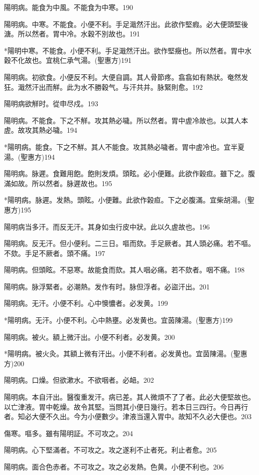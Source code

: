\documentclass[12pt,twoside,UTF8,b5paper]{ctexbook}
\begin{document}
陽明病。能食为中風。不能食为中寒。190

陽明{病。}中寒。不能食。小便不利。手足濈然汗出。此欲作堅瘕。必大便頭堅後溏。所以然者。胃中冷。水穀不別故也。191

*陽明中寒。不能食。小便不利。手足濈然汗出。欲作堅癥也。所以然者。胃中水穀不化故也。宜桃仁承气湯。(聖惠方)191

陽明病。初欲食。小便反不利。大便自調。其人骨節疼。翕翕如有熱狀。奄然发狂。濈然汗出而觧。此为水不勝穀气。与汗共并。脉緊則愈。192

陽明病欲觧时。從申尽戍。193

陽明病。不能食。下之不觧。攻其熱必噦。所以然者。胃中虗冷故也。{以其人本虗。故攻其熱必噦。}194

*陽明病。能食。下之不觧。其人不能食。攻其熱必噦者。胃中虗冷也。宜半夏湯。(聖惠方)194

陽明病。脉遲。食難用飽。飽則发煩。頭眩。必小便難。此欲作穀疸。雖下之。腹滿如故。所以然者。脉遲故也。195

*陽明病。脉遲。发熱。頭眩。小便難。此欲作榖疸。下之必腹滿。宜柴胡湯。(聖惠方)195

陽明病当多汗。而反无汗。其身如虫行皮中狀。此以久虗故也。196

陽明病。反无汗。但小便利。二三日。嘔而欬。手足厥者。其人頭必痛。若不嘔。不欬。手足不厥者。頭不痛。197

陽明病。但頭眩。不惡寒。故能食而欬。其人咽必痛。若不欬者。咽不痛。198

陽明病。脉浮緊者。必潮熱。发作有时。{脉}但浮者。必盜汗出。201

陽明病。无汗。小便不利。心中懊憹者。必发黄。199

*陽明病。无汗。小便不利。心中熱壅。必发黄也。宜茵陳湯。(聖惠方)199

陽明病。被火。額上微汗出。小便不利者。必发黄。200

*陽明病。被火灸。其額上微有汗出。小便不利者。必发黄也。宜茵陳湯。(聖惠方)200

陽明病。口燥。但欲漱水。不欲咽者。必衄。202

陽明病。本自汗出。醫復重发汗。病已差。其人微煩不了了者。此必大便堅故也。以亡津液。胃中乾燥。故令其堅。当問其小便日幾行。若本日三四行。今日再行者。知必大便不久出。今为小便數少。津液当還入胃中。故知不久必大便也。203

傷寒。嘔多。雖有陽明証。不可攻之。204

陽明病。心下堅滿者。不可攻之。攻之遂利不止者死。利止者愈。205

陽明病。面合色赤者。不可攻之。{攻之}必发熱。色黄。小便不利也。206
\end{document}
